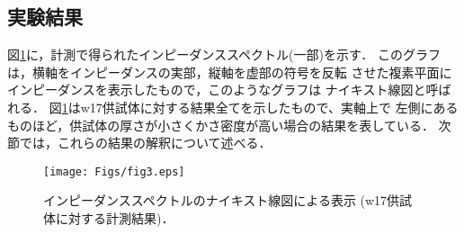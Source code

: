 \documentclass{jsce}
\begin{document}
\subsection{実験結果}
図\ref{fig:fig3}に，計測で得られたインピーダンススペクトル(一部)を示す．
このグラフは，横軸をインピーダンスの実部，縦軸を虚部の符号を反転
させた複素平面にインピーダンスを表示したもので，このようなグラフは
ナイキスト線図と呼ばれる．
図\ref{fig:fig3}はw17供試体に対する結果全てを示したもので、実軸上で
左側にあるものほど，供試体の厚さが小さくかさ密度が高い場合の結果を表している．
次節では，これらの結果の解釈について述べる．
\begin{figure}[h]
	\begin{center}
	\texttt{[image: Figs/fig3.eps]} 
	\end{center}
	\caption{
		インピーダンススペクトルのナイキスト線図による表示
		(w17供試体に対する計測結果)．
	} 
	\label{fig:fig3}
\end{figure}
\end{document}
